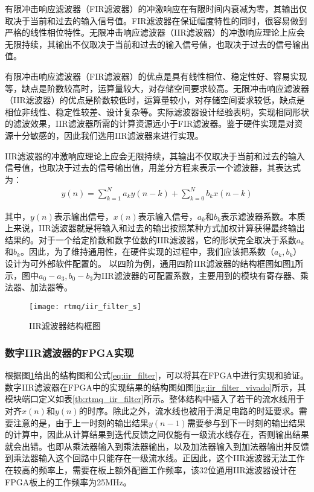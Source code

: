 有限冲击响应滤波器（FIR滤波器）的冲激响应在有限时间内衰减为零，其输出仅取决于当前和过去的输入信号值。FIR滤波器在保证幅度特性的同时，很容易做到严格的线性相位特性。无限冲击响应滤波器（IIR滤波器）的冲激响应理论上应会无限持续，其输出不仅取决于当前和过去的输入信号值，也取决于过去的信号输出值。

有限冲击响应滤波器（FIR滤波器）的优点是具有线性相位、稳定性好、容易实现等，缺点是阶数较高时，运算量较大，对存储空间要求较高。无限冲击响应滤波器（IIR滤波器）的优点是阶数较低时，运算量较小，对存储空间要求较低，缺点是相位非线性、稳定性较差、设计复杂等。实际滤波器设计经验表明，实现相同形状的滤波效果，IIR滤波器所需的计算资源远小于FIR滤波器。鉴于硬件实现是对资源十分敏感的，因此我们选用IIR滤波器来进行实现。

IIR滤波器的冲激响应理论上应会无限持续，其输出不仅取决于当前和过去的输入信号值，也取决于过去的信号输出值，用差分方程来表示一个滤波器，其表达式为：
\begin{align}
    y(n)=\sum_{k=1}^Na_ky(n-k)+\sum_{k=0}^Nb_kx(n-k)\label{eq:iir_filter}
\end{align}


其中，$y(n)$表示输出信号，$x(n)$表示输入信号，$a_k$和$b_k$表示滤波器系数。本质上来说，IIR滤波器就是将输入和过去的输出按照某种方式加权计算获得最终输出结果的。对于一个给定阶数和数字位数的IIR滤波器，它的形状完全取决于系数$a_k$和$b_k$。因此，为了维持通用性，在硬件实现的过程中，我们应该把系数（$a_k, b_k$）设计为可外部软件配置的。
以四阶为例，通用四阶IIR滤波器的结构框图如图\ref{fig:iir_filter_s}所示，图中$a_0-a_3, b_0-b_3$为IIR滤波器的可配置系数，主要用到的模块有寄存器、乘法器、加法器等。
\begin{figure}
    \centering
    \caption[IIR滤波器结构框图]{IIR滤波器结构框图\label{fig:iir_filter_s}}
    \texttt{[image: rtmq/iir\_filter\_s]}
\end{figure}


\subsubsection[高速通用数字IIR滤波器的FPGA实现]{数字IIR滤波器的FPGA实现}

根据图\ref{fig:iir_filter_s}给出的结构图和公式\eqref{eq:iir_filter}，可以将其在FPGA中进行实现和验证。数字IIR滤波器在FPGA中的实现结果的结构图如图\ref{fig:iir_filter_vivado}所示，其模块端口定义如表\ref{tb:rtmq_iir_filter}所示。整体结构中插入了若干的流水线用于对齐$x(n)$和$y(n)$的时序。除此之外，流水线也被用于满足电路的时延要求。需要注意的是，由于上一时刻的输出结果$y(n-1)$需要参与到下一时刻的输出结果的计算中，因此从计算结果到迭代反馈之间仅能有一级流水线存在，否则输出结果就会出错。也即从乘法器输入到乘法器输出，以及加法器输入到加法器输出并反馈到乘法器输入这个回路中只能存在一级流水线。正因此，这个IIR滤波器无法工作在较高的频率上，需要在板上额外配置工作频率，该32位通用IIR滤波器设计在FPGA板上的工作频率为25MHz。


